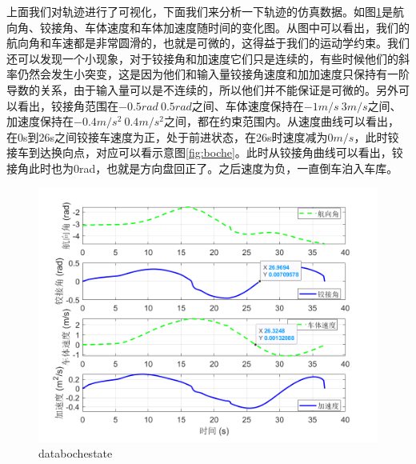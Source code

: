 \documentclass[master,academic]{ysuthesis} %
\begin{document}
		上面我们对轨迹进行了可视化，下面我们来分析一下轨迹的仿真数据。如图\ref{fig:databochestate}是航向角、铰接角、车体速度和车体加速度随时间的变化图。从图中可以看出，我们的航向角和车速都是非常圆滑的，也就是可微的，这得益于我们的运动学约束。我们还可以发现一个小现象，对于铰接角和加速度它们只是连续的，有些时候他们的斜率仍然会发生小突变，这是因为他们和输入量铰接角速度和加加速度只保持有一阶导数的关系，由于输入量可以是不连续的，所以他们并不能保证是可微的。另外可以看出，铰接角范围在$-0.5rad~0.5rad$之间、车体速度保持在$-1m/s~3m/s$之间、加速度保持在$-0.4m/s^2~0.4m/s^2$之间，都在约束范围内。从速度曲线可以看出，在0s到26s之间铰接车速度为正，处于前进状态，在26s时速度减为$0m/s$，此时铰接车到达换向点，对应可以看示意图\ref{fig:boche}。此时从铰接角曲线可以看出，铰接角此时也为0rad，也就是方向盘回正了。之后速度为负，一直倒车泊入车库。
		\begin{figure}[!ht]
			\centering
			\includegraphics[width=1\textwidth]{databochestate.png}
			\caption{databochestate}
			\label{fig:databochestate}
		\end{figure}
\end{document}
